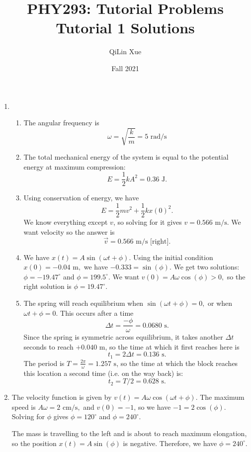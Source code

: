 \documentclass{article}
\title{PHY293: Tutorial Problems \\ \textbf{Tutorial 1 Solutions}}
\author{QiLin Xue}
\date{Fall 2021}
\begin{document}
\maketitle
\begin{enumerate}
    \item \begin{enumerate}
        \item The angular frequency is $$\boxed{\omega = \sqrt{\frac{k}{m}} = 5\text{ rad/s}}$$
        \item The total mechanical energy of the system is equal to the potential energy at maximum compression: $$\boxed{E = \frac{1}{2}kA^2 = 0.36 \text{ J}}.$$
        \item Using conservation of energy, we have
        \begin{equation*}
            E = \frac{1}{2}mv^2 + \frac{1}{2}kx(0)^2.
        \end{equation*}
        We know everything except $v$, so solving for it gives $v = 0.566 \text{ m/s}.$ We want velocity so the answer is $$\boxed{\vec{v} = 0.566\text{ m/s [right]}}.$$
        \item We have $x(t)=A\sin(\omega t + \phi).$ Using the initial condition $x(0)=-0.04\text{ m},$ we have $-0.333 = \sin(\phi).$ We get two solutions: $\phi = -19.47^\circ$ and $\phi = 199.5^\circ.$ We want $v(0) = A\omega\cos(\phi)> 0,$ so the right solution is $\boxed{\phi=19.47^\circ}$.
        \item The spring will reach equilibrium when $\sin(\omega t+\phi)=0,$ or when $\omega t + \phi = 0$. This occurs after a time $$\Delta t = \frac{-\phi}{\omega} = 0.0680 \text{ s}.$$
        Since the spring is symmetric across equilibrium, it takes another $\Delta t$ seconds to reach $+0.040\text{ m}$, so the time at which it first reaches here is $$\boxed{t_1 = 2\Delta t = 0.136\text{ s}.}$$
        The period is $T=\frac{2\pi}{\omega} = 1.257\text{ s}$, so the time at which the block reaches this location a second time (i.e. on the way back) is: 
        $$\boxed{t_2 = T/2 = 0.628\text{ s}}.$$
    \end{enumerate}
    \item The velocity function is given by $v(t)=A\omega \cos(\omega t + \phi).$ The maximum speed is $A\omega = 2\text{ cm/s},$ and $v(0)=-1$, so we have $-1=2\cos(\phi)$. Solving for $\phi$ gives $\phi=120^\circ$ and $\phi=240^\circ$.
    
    The mass is travelling to the left and is about to reach maximum elongation, so the position $x(t)=A\sin(\phi)$ is negative. Therefore, we have $\boxed{\phi=240^\circ}$.


\end{enumerate}
\end{document}
